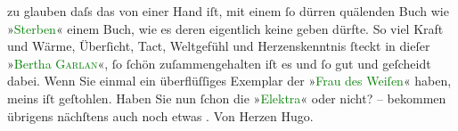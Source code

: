                zu glauben daſs das von einer Hand iſt, mit einem ſo dürren quälenden Buch wie »\textcolor{green}{Sterben}{}\ledrightnote{\textcolor{green}{Sterben. Novelle}}« einem Buch, wie es deren eigentlich keine
               geben dürfte. {\pb}So viel Kraft und
               Wärme, Überſicht, Tact, Weltgefühl und Herzenskenntnis ſteckt in dieſer »\textcolor{green}{Bertha \textsc{Garlan}}{}\ledrightnote{\textcolor{green}{Frau Bertha Garlan. Roman}}«, ſo ſchön zuſammengehalten iſt es und ſo gut und geſcheidt dabei.\pend
           \pstart
           Wenn Sie einmal ein überflüſſiges Exemplar der »\textcolor{green}{Frau des
                  Weiſen}{}\ledrightnote{\textcolor{green}{Die Frau des Weisen. Novelletten}}« haben, meins iſt geſtohlen.\pend
           \pstart
           Haben Sie nun ſchon die »\textcolor{green}{Elektra}{}\ledrightnote{\textcolor{green}{Elektra. Tragödie in einem Aufzug}}« oder nicht? –
               bekommen übrigens nächſtens auch noch etwas \label{K_L01347_1v}\label{K_L01347_1h}.\pend
           \pstart Von Herzen \spacefill\mbox{Hugo.}\pend{}\endnumbering{}  
      